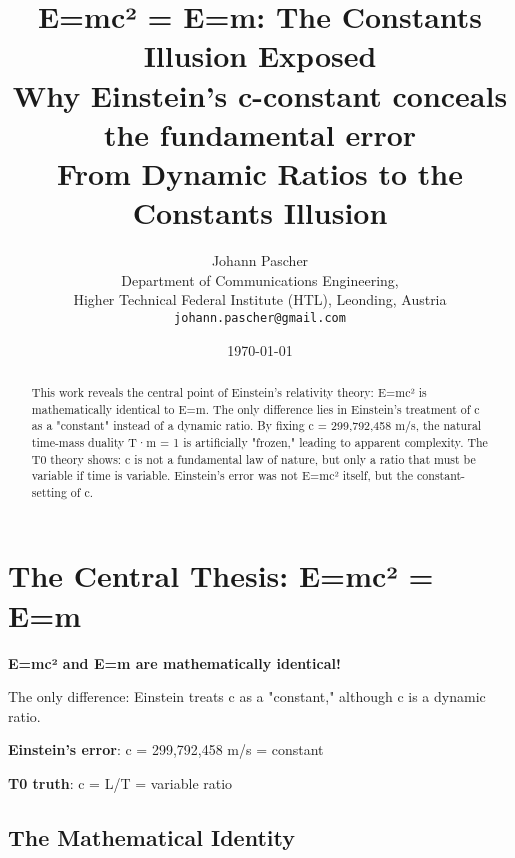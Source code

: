 \documentclass[12pt,a4paper]{article}
\begin{document}
	
	\title{E=mc² = E=m: The Constants Illusion Exposed \\
		Why Einstein's c-constant conceals the fundamental error \\
		\large From Dynamic Ratios to the Constants Illusion}
	\author{Johann Pascher\\
		Department of Communications Engineering, \\Higher Technical Federal Institute (HTL), Leonding, Austria\\
		\texttt{johann.pascher@gmail.com}}
	\date{\today}
	
	\maketitle
	
	\begin{abstract}
		This work reveals the central point of Einstein's relativity theory: E=mc² is mathematically identical to E=m. The only difference lies in Einstein's treatment of c as a "constant" instead of a dynamic ratio. By fixing c = 299,792,458 m/s, the natural time-mass duality T·m = 1 is artificially "frozen," leading to apparent complexity. The T0 theory shows: c is not a fundamental law of nature, but only a ratio that must be variable if time is variable. Einstein's error was not E=mc² itself, but the constant-setting of c.
	\end{abstract}
	
	\tableofcontents
	\newpage
	
	\section{The Central Thesis: E=mc² = E=m}
	
	\begin{tcolorbox}[colback=red!5!white,colframe=red!75!black,title=The Fundamental Recognition]
		\textbf{E=mc² and E=m are mathematically identical!}
		
		The only difference: Einstein treats c as a "constant," although c is a dynamic ratio.
		
		\textbf{Einstein's error}: c = 299,792,458 m/s = constant
		
		\textbf{T0 truth}: c = L/T = variable ratio
	\end{tcolorbox}
	
	\subsection{The Mathematical Identity}
	
\end{document}
